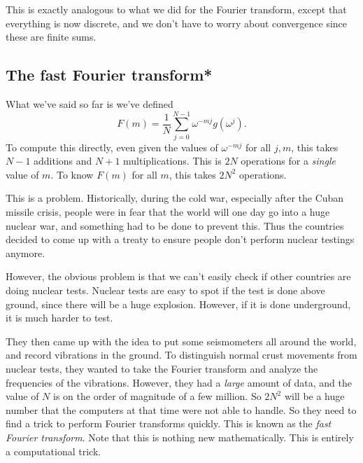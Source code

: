 \documentclass[a4paper]{article}
\begin{document}
This is exactly analogous to what we did for the Fourier transform, except that everything is now discrete, and we don't have to worry about convergence since these are finite sums.

\subsection{The fast Fourier transform*}
What we've said so far is we've defined
\[
  F(m) = \frac{1}{N} \sum_{j = 0}^{N - 1} \omega^{-mj}g(\omega^j).
\]
To compute this directly, even given the values of $\omega^{-mj}$ for all $j, m$, this takes $N - 1$ additions and $N + 1$ multiplications. This is $2N$ operations for a \emph{single} value of $m$. To know $F(m)$ for all $m$, this takes $2N^2$ operations.

This is a problem. Historically, during the cold war, especially after the Cuban missile crisis, people were in fear that the world will one day go into a huge nuclear war, and something had to be done to prevent this. Thus the countries decided to come up with a treaty to ensure people don't perform nuclear testings anymore.

However, the obvious problem is that we can't easily check if other countries are doing nuclear tests. Nuclear tests are easy to spot if the test is done above ground, since there will be a huge explosion. However, if it is done underground, it is much harder to test.

They then came up with the idea to put some seismometers all around the world, and record vibrations in the ground. To distinguish normal crust movements from nuclear tests, they wanted to take the Fourier transform and analyze the frequencies of the vibrations. However, they had a \emph{large} amount of data, and the value of $N$ is on the order of magnitude of a few million. So $2N^2$ will be a huge number that the computers at that time were not able to handle. So they need to find a trick to perform Fourier transforms quickly. This is known as the \emph{fast Fourier transform}. Note that this is nothing new mathematically. This is entirely a computational trick.
\end{document}
